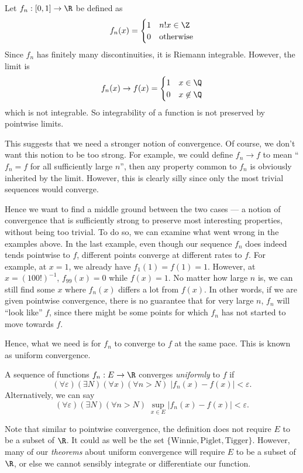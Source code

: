 \documentclass[a4paper]{article}
\begin{document}
\begin{eg}
  Let $f_n: [0, 1] \to \R$ be defined as
  \[
    f_n (x) =
    \begin{cases}
      1 & n!x \in \Z\\
      0 & \text{otherwise}
    \end{cases}
  \]
  Since $f_n$ has finitely many discontinuities, it is Riemann integrable. However, the limit is
  \[
    f_n(x) \to f(x) =
    \begin{cases}
      1 & x\in \Q\\
      0 & x\not\in \Q
    \end{cases}
  \]
  which is not integrable. So integrability of a function is not preserved by pointwise limits.
\end{eg}
This suggests that we need a stronger notion of convergence. Of course, we don't want this notion to be too strong. For example, we could define $f_n \to f$ to mean ``$f_n = f$ for all sufficiently large $n$'', then any property common to $f_n$ is obviously inherited by the limit. However, this is clearly silly since only the most trivial sequences would converge.

Hence we want to find a middle ground between the two cases --- a notion of convergence that is sufficiently strong to preserve most interesting properties, without being too trivial. To do so, we can examine what went wrong in the examples above. In the last example, even though our sequence $f_n$ does indeed tends pointwise to $f$, different points converge at different rates to $f$. For example, at $x = 1$, we already have $f_1(1) = f(1) = 1$. However, at $x = (100!)^{-1}$, $f_{99}(x) = 0$ while $f(x) = 1$. No matter how large $n$ is, we can still find some $x$ where $f_n(x)$ differs a lot from $f(x)$. In other words, if we are given pointwise convergence, there is no guarantee that for very large $n$, $f_n$ will ``look like'' $f$, since there might be some points for which $f_n$ has not started to move towards $f$.

Hence, what we need is for $f_n$ to converge to $f$ at the same pace. This is known as uniform convergence.

\begin{defi}
  A sequence of functions $f_n: E\to \R$ converges \emph{uniformly} to $f$ if
  \[
    (\forall \varepsilon)(\exists N)(\forall x)(\forall n > N)\; |f_n(x) - f(x)| < \varepsilon.
  \]
  Alternatively, we can say
  \[
    (\forall \varepsilon)(\exists N)(\forall n > N)\; \sup_{x\in E} |f_n(x) - f(x)| < \varepsilon.
  \]
\end{defi}
Note that similar to pointwise convergence, the definition does not require $E$ to be a subset of $\R$. It could as well be the set $\{\text{Winnie},\text{Piglet},\text{Tigger}\}$. However, many of our \emph{theorems} about uniform convergence will require $E$ to be a subset of $\R$, or else we cannot sensibly integrate or differentiate our function.
\end{document}
